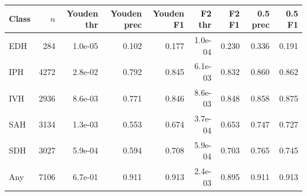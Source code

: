 \begin{tabular}{lrrrrrrrr}
\toprule
Class & $n$ & Youden thr & Youden prec & Youden F1 & F2 thr & F2 F1 & 0.5 prec & 0.5 F1 \\
\midrule
EDH & 284 & 1.0e-05 & 0.102 & 0.177 & 1.0e-04 & 0.230 & 0.336 & 0.191 \\
IPH & 4272 & 2.8e-02 & 0.792 & 0.845 & 6.1e-03 & 0.832 & 0.860 & 0.862 \\
IVH & 2936 & 8.6e-03 & 0.771 & 0.846 & 8.6e-03 & 0.848 & 0.858 & 0.875 \\
SAH & 3134 & 1.3e-03 & 0.553 & 0.674 & 3.7e-04 & 0.653 & 0.747 & 0.727 \\
SDH & 3027 & 5.9e-04 & 0.594 & 0.708 & 5.9e-04 & 0.703 & 0.765 & 0.745 \\
Any & 7106 & 6.7e-01 & 0.911 & 0.913 & 2.4e-03 & 0.895 & 0.911 & 0.913 \\
\bottomrule
\end{tabular}

